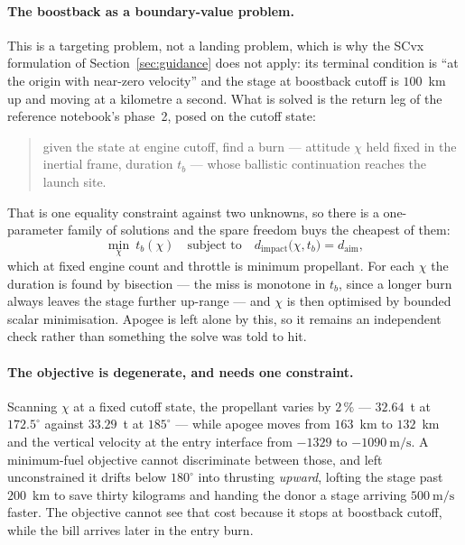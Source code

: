 \documentclass[11pt,a4paper]{article}
\begin{document}
\paragraph{The boostback as a boundary-value problem.} This is a targeting
problem, not a landing problem, which is why the SCvx formulation of
Section~\ref{sec:guidance} does not apply: its terminal condition is ``at the
origin with near-zero velocity'' and the stage at boostback cutoff is $100$~km up
and moving at a kilometre a second. What is solved is the return leg of the
reference notebook's phase~2, posed on the cutoff state:

\begin{quote}
given the state at engine cutoff, find a burn --- attitude $\chi$ held fixed in
the inertial frame, duration $t_b$ --- whose ballistic continuation reaches the
launch site.
\end{quote}

That is one equality constraint against two unknowns, so there is a
one-parameter family of solutions and the spare freedom buys the cheapest of
them:
\begin{equation}
\min_{\chi}\ t_b(\chi)
\quad\text{subject to}\quad
d_{\mathrm{impact}}\big(\chi, t_b\big) = d_{\mathrm{aim}} ,
\end{equation}
which at fixed engine count and throttle is minimum propellant. For each $\chi$
the duration is found by bisection --- the miss is monotone in $t_b$, since a
longer burn always leaves the stage further up-range --- and $\chi$ is then
optimised by bounded scalar minimisation. Apogee is left alone by this, so it
remains an independent check rather than something the solve was told to hit.

\paragraph{The objective is degenerate, and needs one constraint.} Scanning
$\chi$ at a fixed cutoff state, the propellant varies by $2\,\%$ ---
$32.64$~t at $172.5^\circ$ against $33.29$~t at $185^\circ$ --- while apogee
moves from $163$~km to $132$~km and the vertical velocity at the entry interface
from $-1329$ to $-1090\ \mathrm{m/s}$. A minimum-fuel objective cannot
discriminate between those, and left unconstrained it drifts below $180^\circ$
into thrusting \emph{upward}, lofting the stage past $200$~km to save thirty
kilograms and handing the donor a stage arriving $500\ \mathrm{m/s}$ faster. The
objective cannot see that cost because it stops at boostback cutoff, while the
bill arrives later in the entry burn.
\end{document}
